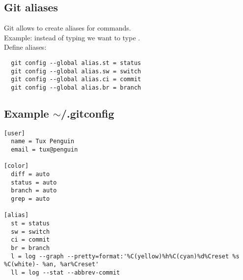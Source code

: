\subsection{Git aliases}
\begin{frame}[fragile]
  \subslidetitle

  Git allows to create aliases for commands.
  \\
  \vspace{1em}
  Example:
  instead of typing  we want to type .
  \\
  \vspace{1em}
  Define aliases:

  \begin{lstlisting}
  git config --global alias.st = status
  git config --global alias.sw = switch
  git config --global alias.ci = commit
  git config --global alias.br = branch
  \end{lstlisting}

\end{frame}

\subsection{Example $\sim$/.gitconfig}
\begin{frame}[fragile]
  \subslidetitle

\begin{lstlisting}
[user]
  name = Tux Penguin
  email = tux@penguin

[color]
  diff = auto
  status = auto
  branch = auto
  grep = auto

[alias]
  st = status
  sw = switch
  ci = commit
  br = branch
  l = log --graph --pretty=format:'%C(yellow)%h%C(cyan)%d%Creset %s %C(white)- %an, %ar%Creset'
  ll = log --stat --abbrev-commit
\end{lstlisting}
\end{frame}
